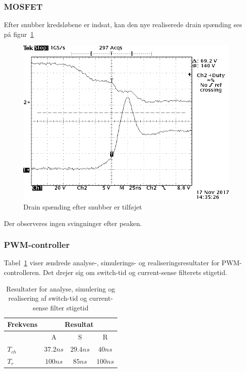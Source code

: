 \subsubsection{MOSFET}
\noindent Efter snubber kredsløbene er indsat, kan den nye realiserede drain spænding ses på figur~\ref{fig:realiseirng_snubber_MOSFET_3} 
\begin{figure}[H]
	\center
	\includegraphics[max width=0.7\linewidth]{../dokumentation/tex/3iteration/billeder/Realisering/Realisering_switch_tid.PNG}
	\caption{Drain spænding efter snubber er tilføjet}
	\label{fig:realiseirng_snubber_MOSFET_3}
\end{figure} 
\noindent Der observeres ingen svingninger efter peaken.

\subsubsection{PWM-controller}
\noindent Tabel~\ref{tab:resultat_klkl} viser ændrede analyse-, simulerings- og realiseringsresultater for PWM-controlleren. Det drejer sig om switch-tid og current-sense filterets stigetid.
\begin{table}[H] 			
	\centering
	\begin{tabularx}{\textwidth}{|X|c|c|c|}
		\hline
		\textbf{Frekvens} & \multicolumn{3}{|c|}{\textbf{Resultat}} 		\\ \hline
		& A & S & R 									\\ \hline 
		$T_{ch}$ & $37.2ns$ & $29.4ns$ & $40ns$ 									\\ \hline
		$T_r$ & $100ns$ & $85ns$ & $100ns$					\\  \hline
	\end{tabularx}
	\caption{Resultater for analyse, simulering og realisering af switch-tid og current-sense filter stigetid}
	\label{tab:resultat_klkl}
\end{table}

